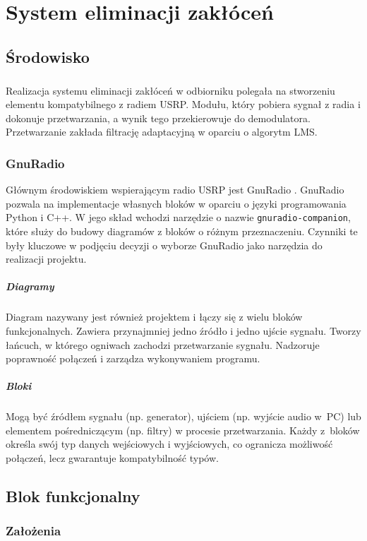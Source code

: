 \chapter{System eliminacji zakłóceń}
\section{Środowisko}
\paragraph{}
Realizacja systemu eliminacji zakłóceń w odbiorniku polegała na stworzeniu elementu kompatybilnego z radiem USRP. Modułu, który pobiera sygnał z radia i dokonuje przetwarzania, a wynik tego przekierowuje do demodulatora.
Przetwarzanie zakłada filtrację adaptacyjną w oparciu o algorytm LMS.
\subsection{GnuRadio}
Głównym środowiskiem wspierającym radio USRP jest GnuRadio \cite{gnuradio}. GnuRadio pozwala na implementacje własnych bloków w oparciu o języki programowania Python i C++. W jego skład wchodzi narzędzie o nazwie \texttt{gnuradio-companion}, które służy do budowy diagramów z bloków o różnym przeznaczeniu. Czynniki te były kluczowe w podjęciu decyzji o wyborze GnuRadio jako narzędzia do realizacji projektu.
\paragraph*{Diagramy}
    Diagram nazywany jest również projektem i łączy się z wielu bloków funkcjonalnych.
    Zawiera przynajmniej jedno źródło i jedno ujście sygnału.
    Tworzy łańcuch, w którego ogniwach zachodzi przetwarzanie sygnału.
    Nadzoruje poprawność połączeń i zarządza wykonywaniem programu.
\paragraph*{Bloki}
    Mogą być źródłem sygnału (np. generator), ujściem (np. wyjście audio w~PC) lub elementem pośredniczącym (np. filtry) w procesie przetwarzania. 
Każdy z~bloków określa swój typ danych wejściowych i wyjściowych, co ogranicza możliwość połączeń, lecz gwarantuje kompatybilność typów.

\section{Blok funkcjonalny}
\subsection{Założenia}

